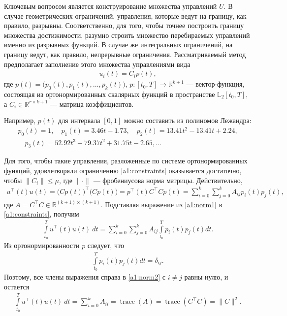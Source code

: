 \documentclass[../main.tex]{subfiles}
\begin{document}
  Ключевым вопросом является конструирование множества управлений $U$.
  В случае геометрических ограничений, управления, которые ведут на границу, как правило, разрывны.
  Соответственно, для того, чтобы точнее построить границу множества достижимости, разумно строить множество перебираемых управлений именно из разрывных функций. 
  В случае же интегральных ограничений, на границу ведут, как правило, непрерывные ограничения. 
  Рассматриваемый метод предполагает заполнение этого множества управлениями вида 
  \begin{gather}
  	u_i(t) = C_i p (t),
  \end{gather}
  где $p(t) = \big(p_{0}(t),p_{1}(t),\dots,p_{k}(t)\big)$, $p: [t_0, {T}] \rightarrow \mathbb{R}^{k+1} $ --- вектор-функция, состоящая из ортонормированных скалярных функций в пространстве $\mathbb{L}_2[t_0, {T}]$, а $C_i \in \mathbb{R}^{r \times k+1}$ --- матрица коэффициентов. 
	  
  Например, $p(t)$ для интервала $[0,1]$ можно составить из полиномов Лежандра:
  \begin{gather*}
  	p_0(t) = 1, \quad p_1(t) = 3.46t-1.73, \quad p_2(t) = 13.41t^2 - 13.41t + 2.24, \\ \quad 
  	p_3(t) = 52.92t^3 - 79.37t^2+31.75t -2.65, ...
  \end{gather*}
  
  Для того, чтобы такие управления, разложенные по системе ортонормированных функций, удовлетворяли ограничению \eqref{a1:constraints} оказывается достаточно, чтобы $\|C_i\| \leqslant \mu$, где $\|\cdot\| $ --- фробениусова норма матрицы.
  Действительно,
  \begin{gather}\label{a1:norm1}
  	 u^{\top}(t) u(t) = \big(C p(t)\big)^{\top} \big(C p(t)\big) = p^{\top}(t) C^{\top} C p(t) = \sum_{i=0}^k \sum_{j=0}^k A_{ij} p_i(t) p_j(t),
  \end{gather}
  где $ A = C^{\top} C \in \mathbb{R}^{(k+1) × (k+1)} $.
  Подставляя выражение из \eqref{a1:norm1} в \eqref{a1:constraints}, получим
  \begin{gather}\label{a1:norm2}
  		\int\limits_{t_0}^T u^{\top}(t) u(t) \ dt = \sum_{i=0}^k \sum_{j=0}^k A_{ij} \int\limits_{t_0}^T p_i(t) p_j(t) dt.
  \end{gather}
  Из ортонормированности $p$ следует, что 
  \begin{gather}
  	\int\limits_{t_0}^T p_i(t) p_j(t) dt = \delta_{ij}. 
  \end{gather}
  Поэтому, все члены выражения справа в \eqref{a1:norm2}  с $i \neq j$ равны нулю, и остается 
  \begin{gather}
  	\int\limits_{t_0}^T u^{\top}(t) u(t) \ dt =  \sum_{i=0}^k  A_{ii} = \operatorname{trace}(A) = \operatorname{trace}(C^{\top} C) = \| C\|^2.
  \end{gather}
  
\end{document}
